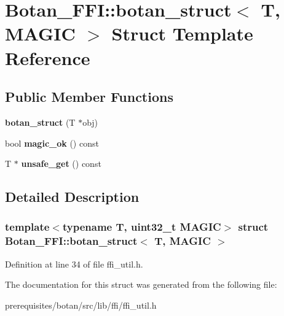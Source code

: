 \hypertarget{struct_botan___f_f_i_1_1botan__struct}{}\section{Botan\+\_\+\+F\+FI\+:\+:botan\+\_\+struct$<$ T, M\+A\+G\+IC $>$ Struct Template Reference}
\label{struct_botan___f_f_i_1_1botan__struct}
\subsection*{Public Member Functions}
\begin{DoxyCompactItemize}
\item 
\mbox{\label{struct_botan___f_f_i_1_1botan__struct_af2310321d0a2ba8458a429c63750dbe6}} 
{\bfseries botan\+\_\+struct} (T $\ast$obj)
\item 
\mbox{\label{struct_botan___f_f_i_1_1botan__struct_af29f31fb7226c6d422e4b34c8cdc92b2}} 
bool {\bfseries magic\+\_\+ok} () const
\item 
\mbox{\label{struct_botan___f_f_i_1_1botan__struct_a102f31a60a48ada584b7f23eba0a7c9d}} 
T $\ast$ {\bfseries unsafe\+\_\+get} () const
\end{DoxyCompactItemize}


\subsection{Detailed Description}
\subsubsection*{template$<$typename T, uint32\+\_\+t M\+A\+G\+IC$>$\newline
struct Botan\+\_\+\+F\+F\+I\+::botan\+\_\+struct$<$ T, M\+A\+G\+I\+C $>$}



Definition at line 34 of file ffi\+\_\+util.\+h.



The documentation for this struct was generated from the following file\+:\begin{DoxyCompactItemize}
\item 
prerequisites/botan/src/lib/ffi/ffi\+\_\+util.\+h\end{DoxyCompactItemize}
